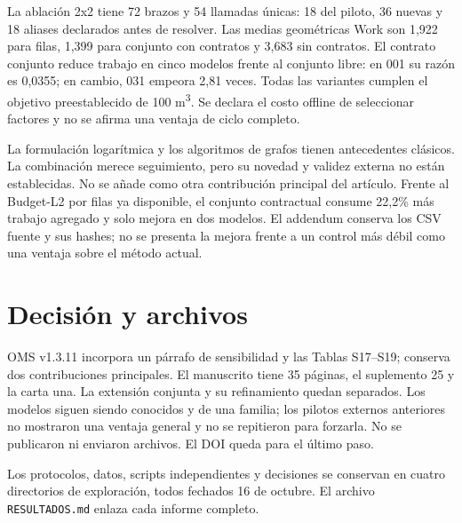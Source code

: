 \documentclass[11pt]{article}
\begin{document}
La ablación 2x2 tiene 72 brazos y 54 llamadas únicas: 18 del piloto, 36 nuevas
y 18 aliases declarados antes de resolver. Las medias geométricas Work son
1,922 para filas, 1,399 para conjunto con contratos y 3,683 sin contratos.
El contrato conjunto reduce trabajo en cinco modelos frente al conjunto libre:
en 001 su razón es 0,0355; en cambio, 031 empeora 2,81 veces. Todas las variantes
cumplen el objetivo preestablecido de 100 m\textsuperscript{3}. Se declara el
costo offline de seleccionar factores y no se afirma una ventaja de ciclo completo.

La formulación logarítmica y los algoritmos de grafos tienen antecedentes
clásicos. La combinación merece seguimiento, pero su novedad y validez externa
no están establecidas. No se añade como otra contribución principal del artículo.
Frente al Budget-L2 por filas ya disponible, el conjunto contractual consume
22,2\% más trabajo agregado y solo mejora en dos modelos. El addendum conserva
los CSV fuente y sus hashes; no se presenta la mejora frente a un control más
débil como una ventaja sobre el método actual.

\section*{Decisión y archivos}
OMS v1.3.11 incorpora un párrafo de sensibilidad y las Tablas S17--S19; conserva
dos contribuciones principales. El manuscrito tiene 35 páginas, el suplemento
25 y la carta una. La extensión conjunta y su refinamiento quedan separados.
Los modelos siguen siendo conocidos y de una familia; los pilotos externos
anteriores no mostraron una ventaja general y no se repitieron para forzarla.
No se publicaron ni enviaron archivos. El DOI queda para el último paso.

\noindent Los protocolos, datos, scripts independientes y decisiones se conservan
en cuatro directorios de exploración, todos fechados 16 de octubre.
El archivo \texttt{RESULTADOS.md} enlaza cada informe completo.
\end{document}
